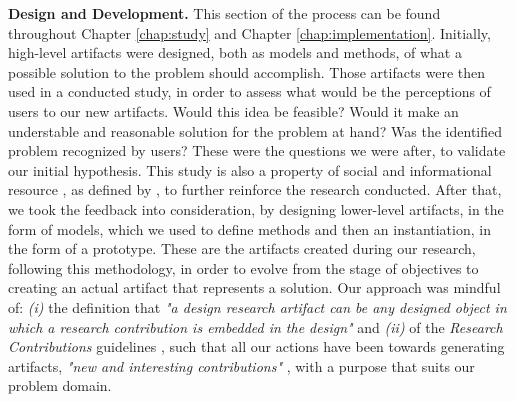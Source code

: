 \textbf{Design and Development.} This section of the process can be found throughout Chapter \ref{chap:study} and Chapter \ref{chap:implementation}. Initially, high-level artifacts were designed, both as models and methods, of what a possible solution to the problem should accomplish. Those artifacts were then used in a conducted study, in order to assess what would be the perceptions of users to our new artifacts. Would this idea be feasible? Would it make an understable and reasonable solution for the problem at hand? Was the identified problem recognized by users? These were the questions we were after, to validate our initial hypothesis. This study is also a property of social and informational resource \cite[6]{peffers_design_2007}, as defined by \citeauthor{peffers_design_2007} \cite{peffers_design_2007}, to further reinforce the research conducted. After that, we took the feedback into consideration, by designing lower-level artifacts, in the form of models, which we used to define methods and then an instantiation, in the form of a prototype. These are the artifacts created during our research, following this methodology, in order to evolve from the stage of objectives to creating an actual artifact that represents a solution. Our approach was mindful of: \emph{(i)} the definition that \textit{"a design research artifact can be any designed object in which a research contribution is embedded in the design"} \cite[13]{peffers_design_2007} and \emph{(ii)} of the \textit{Research Contributions} guidelines \cite[87]{hevner_design_2004}, such that all our actions have been towards generating artifacts, \textit{"new and interesting contributions"} \cite[87]{hevner_design_2004}, with a purpose that suits our problem domain.

